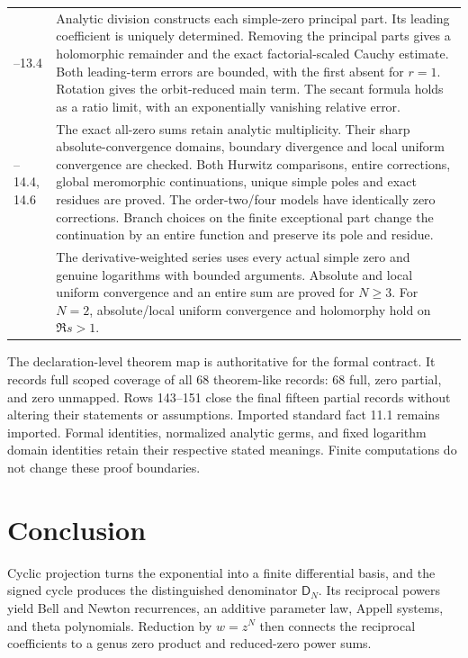 \documentclass[11pt,letterpaper]{article}
\theoremstyle{definition}
\theoremstyle{remark}
\newcommand{\Dfun}{\mathsf D}
\begin{document}
\begin{longtable}{@{}>{\raggedright\arraybackslash}p{}>{\raggedright\arraybackslash}p{}@{}}
13.1--13.4 & Analytic division constructs each simple-zero principal part.
Its leading coefficient is uniquely determined. Removing the principal parts
gives a holomorphic remainder and the exact factorial-scaled Cauchy estimate.
Both leading-term errors are bounded, with the first absent for $r=1$.
Rotation gives the orbit-reduced main term. The secant formula holds as a
ratio limit, with an exponentially vanishing relative error. \\
14.2--14.4, 14.6 & The exact all-zero sums retain analytic multiplicity.
Their sharp absolute-convergence domains, boundary divergence and local
uniform convergence are checked. Both Hurwitz comparisons, entire corrections,
global meromorphic continuations, unique simple poles and exact residues are
proved. The order-two/four models have identically zero corrections. Branch
choices on the finite exceptional part change the continuation by an entire
function and preserve its pole and residue. \\
14.8 & The derivative-weighted series uses every actual simple zero and genuine
logarithms with bounded arguments. Absolute and local uniform convergence and
an entire sum are proved for $N\geq3$. For $N=2$, absolute/local uniform
convergence and holomorphy hold on $\Re s>1$. \\
\bottomrule
\end{longtable}
\endgroup

The declaration-level theorem map is authoritative for the formal
contract. It records full scoped coverage of all 68
theorem-like records: 68 full, zero partial, and zero unmapped. Rows 143--151 close the final fifteen partial records
without altering their statements or assumptions. Imported standard fact
11.1 remains imported. Formal identities, normalized analytic germs, and
fixed logarithm domain identities retain their respective stated meanings.
Finite computations do not change these proof boundaries.

\section{Conclusion}\label{sec:conclusion}

Cyclic projection turns the exponential into a finite differential basis, and
the signed cycle produces the distinguished denominator $\Dfun_N$. Its
reciprocal powers yield Bell and Newton recurrences, an additive parameter
law, Appell systems, and theta polynomials. Reduction by $w=z^N$ then connects
the reciprocal coefficients to a genus zero product and reduced-zero power
sums.
\end{document}
